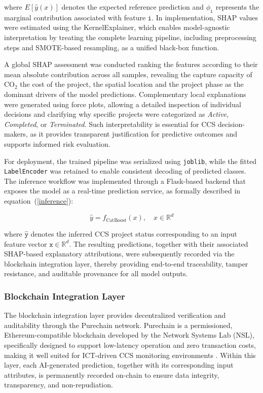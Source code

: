 \documentclass[conference]{IEEEtran}
\begin{document}
where $E[\hat{y}(x)]$ denotes the expected reference prediction and $\mathtt{\phi_i}$ represents the marginal contribution associated with feature $\mathtt{i}$. In implementation, SHAP values were estimated using the KernelExplainer, which enables model-agnostic interpretation by treating the complete learning pipeline, including preprocessing steps and SMOTE-based resampling, as a unified black-box function.

A global SHAP assessment was conducted ranking the features according to their mean absolute contribution across all samples, revealing the capture capacity of CO$_2$ the cost of the project, the spatial location and the project phase as the dominant drivers of the model predictions. Complementary local explanations were generated using force plots, allowing a detailed inspection of individual decisions and clarifying why specific projects were categorized as \textit{Active}, \textit{Completed}, or \textit{Terminated}. Such interpretability is essential for CCS decision-makers, as it provides transparent justification for predictive outcomes and supports informed risk evaluation.

For deployment, the trained pipeline was serialized using \texttt{joblib}, while the fitted \texttt{LabelEncoder} was retained to enable consistent decoding of predicted classes. The inference workflow was implemented through a Flask-based backend that exposes the model as a real-time prediction service, as formally described in equation~(\ref{inference}):


\vspace{-0.4cm}
\begin{equation}
\label{inference}
    \hat{y} = f_{\text{CatBoost}}(x), \quad x \in \mathbb{R}^d
\end{equation}

where $\mathtt{\hat{y}}$ denotes the inferred CCS project status corresponding to an input feature vector $\mathtt{x} \in \mathbb{R}^d$. The resulting predictions, together with their associated SHAP-based explanatory attributions, were subsequently recorded via the blockchain integration layer, thereby providing end-to-end traceability, tamper resistance, and auditable provenance for all model outputs.


\subsubsection{\textbf{Blockchain Integration Layer}}

The blockchain integration layer provides decentralized verification and auditability through the Purechain network. Purechain is a permissioned, Ethereum-compatible blockchain developed by the Network Systems Lab (NSL), specifically designed to support low-latency operation and zero transaction costs, making it well suited for ICT-driven CCS monitoring environments \cite{ajakwe2025eBCTC}. Within this layer, each AI-generated prediction, together with its corresponding input attributes, is permanently recorded on-chain to ensure data integrity, transparency, and non-repudiation.
\end{document}

